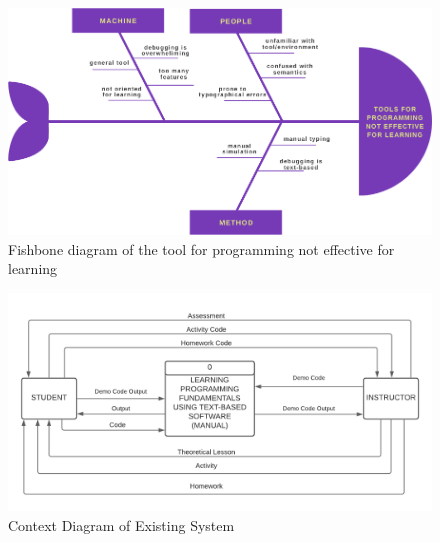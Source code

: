 \begin{doublespace}
\begin{center}
		\newpage
		\null\vfill
		\begin{figure}[H]
			\centering
			\includegraphics[width=0.8\textheight,angle=90]{figures/fishbone3.png}
			\caption[Ishikawa Diagram 3]{Fishbone diagram of the tool for programming not effective for
			learning}
			\label{fig:fishbone3}
		\end{figure}
		\vfill

		\newpage
		\null\vfill
		\begin{figure}[H]
			\centering
			\includegraphics[width=\textwidth]{figures/context_diagram_manual.png}
			\caption{Context Diagram of Existing System}
			\label{fig:context_diagram_manual}
		\end{figure}
		\vfill


\end{center}
\end{doublespace}
